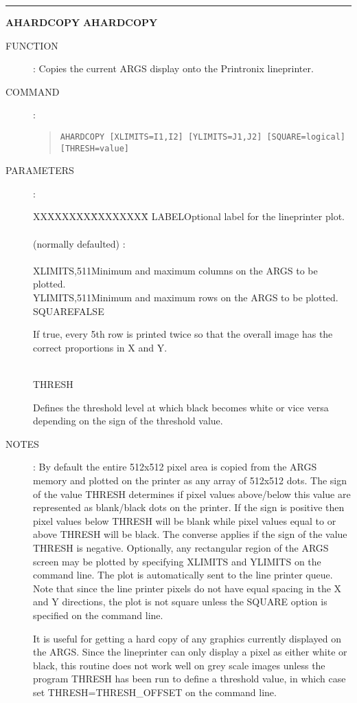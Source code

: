 \goodbreak
\rule{\textwidth}{0.3mm}
{\Large {\bf AHARDCOPY} \hfill {\bf AHARDCOPY}}
\begin{description}
\item [FUNCTION]:
Copies the current ARGS display onto the Printronix lineprinter.
\item [COMMAND]:
\begin{quote}
{\tt AHARDCOPY [XLIMITS=I1,I2] [YLIMITS=J1,J2] [SQUARE=logical] [THRESH=value]}
\end{quote}
\item [PARAMETERS]:
\begin{tabbing}
XXXXXXXX\=XXXXXXXX\=\kill
LABEL\>\>Optional label for the lineprinter plot.\\
\\
(normally defaulted) :\\
\\
XLIMITS,511\>Minimum and maximum columns on the ARGS to be plotted.\\
YLIMITS,511\>Minimum and maximum rows on the ARGS to be plotted.\\
SQUARE\>FALSE\>\begin{minipage}[t]{100mm}
If true, every 5th row is printed twice so that the overall image has the
correct proportions in X and Y.
\end{minipage}\\
THRESH\>\begin{minipage}[t]{100mm}
Defines the threshold level at which black becomes white or vice versa
depending on the sign of the threshold value.
\end{minipage}
\end{tabbing}
\item [NOTES]:
By default the entire 512x512 pixel area is copied from the ARGS memory and
plotted on the printer as any array of 512x512 dots.
The sign of the value THRESH determines if pixel values above/below this value
are represented as blank/black dots on the printer.
If the sign is positive then pixel values below THRESH will be blank while
pixel values equal to or above THRESH will be black.
The converse applies if the sign of the value THRESH is negative.
Optionally, any rectangular region of the ARGS screen may be plotted by
specifying XLIMITS and YLIMITS on the command line.
The plot is automatically sent to the line printer queue.
Note that since the line printer pixels do not have equal spacing in the X and
Y directions, the plot is not square unless the SQUARE option is specified on
the command line.

It is useful for getting a hard copy of any graphics currently displayed on the
ARGS.
Since the lineprinter can only display a pixel as either white or black, this
routine does not work well on grey scale images unless the program THRESH has
been run to define a threshold value, in which case set THRESH=THRESH\_OFFSET
on the command line.
\end{description}


